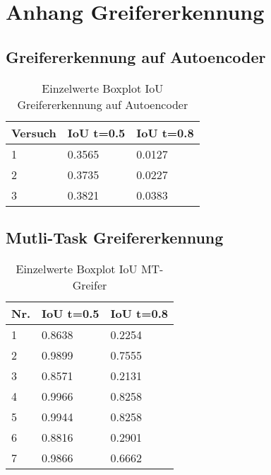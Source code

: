 \chapter{Anhang  Greifererkennung}
\label{appendix:Greifererkennung}

	\section{Greifererkennung auf Autoencoder}
	\label{appendix:GreifererkennungAufAutoencoder}
	
		\begin{table}[ht]
		\centering
		\begin{tabularx}{\textwidth}{lll}
			\textbf{Versuch}  & \textbf{IoU t=0.5} & \textbf{IoU t=0.8}  	 \\ \hline 
			1 & 0.3565 & 0.0127 \\
			2 & 0.3735 & 0.0227 \\
			3 & 0.3821 & 0.0383 \\ 
		\end{tabularx}
		\caption{Einzelwerte Boxplot IoU Greifererkennung auf Autoencoder}
		\label{table:EinzelwerteBoxplotIoUGreifererkennungaufAutoencoder}
	\end{table}

	\section{Mutli-Task Greifererkennung}
	\label{appendix:MutliTaskGreifererkennung}
	
	\begin{table}[ht]
	\centering
	\begin{tabularx}{\textwidth}{lll}
		 \textbf{Nr.}  & \textbf{IoU t=0.5} & \textbf{IoU t=0.8}  	 \\ \hline 
		1 & 0.8638 & 0.2254 \\
		2 & 0.9899 & 0.7555 \\
		3 & 0.8571  & 0.2131 \\
		4 & 0.9966 & 0.8258 \\
		5 & 0.9944 & 0.8258  \\
		6 & 0.8816 & 0.2901 \\
		7 & 0.9866 & 0.6662 \\
	
	\end{tabularx}
	\caption{Einzelwerte Boxplot IoU MT-Greifer}
	\label{table:EinzelwerteBoxplotIoUMTGreifer}
\end{table}

